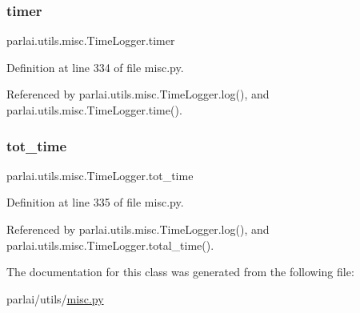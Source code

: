 \subsubsection{\texorpdfstring{timer}{timer}}
{\footnotesize\ttfamily parlai.\+utils.\+misc.\+Time\+Logger.\+timer}



Definition at line 334 of file misc.\+py.



Referenced by parlai.\+utils.\+misc.\+Time\+Logger.\+log(), and parlai.\+utils.\+misc.\+Time\+Logger.\+time().

\mbox{\label{classparlai_1_1utils_1_1misc_1_1TimeLogger_a831849f16f6779f8b77289c3caa65689}} 
\subsubsection{\texorpdfstring{tot\+\_\+time}{tot\_time}}
{\footnotesize\ttfamily parlai.\+utils.\+misc.\+Time\+Logger.\+tot\+\_\+time}



Definition at line 335 of file misc.\+py.



Referenced by parlai.\+utils.\+misc.\+Time\+Logger.\+log(), and parlai.\+utils.\+misc.\+Time\+Logger.\+total\+\_\+time().



The documentation for this class was generated from the following file\+:\begin{DoxyCompactItemize}
\item 
parlai/utils/\hyperlink{misc_8py}{misc.\+py}\end{DoxyCompactItemize}
